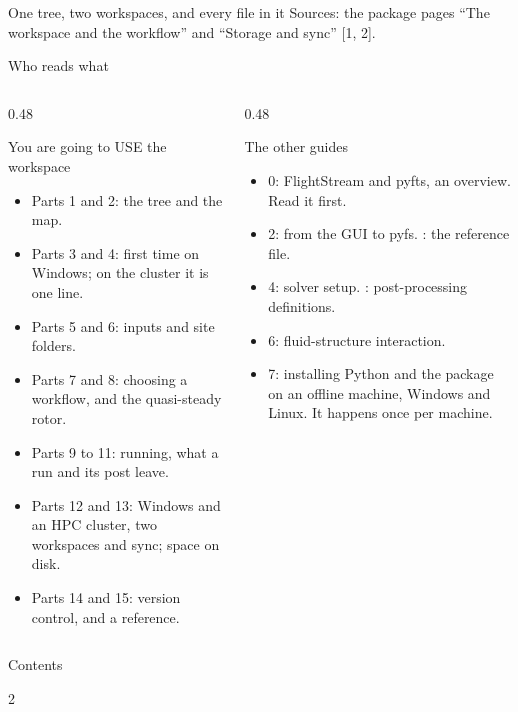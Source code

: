 \documentclass[aspectratio=169,11pt]{beamer}
\begin{document}
  {One tree, two workspaces, and every file in it}
  {Sources: the package pages ``The workspace and the workflow'' and
   ``Storage and sync'' [1, 2].}

\begin{frame}{Who reads what}
\begin{columns}[T]
\begin{column}{0.48\textwidth}
\begin{block}{You are going to USE the workspace}
\begin{itemize}\small
  \item Parts 1 and 2: the tree and the map.
  \item Parts 3 and 4: first time on Windows; on the cluster it is one line.
  \item Parts 5 and 6: inputs and site folders.
  \item Parts 7 and 8: choosing a workflow, and the quasi-steady rotor.
  \item Parts 9 to 11: running, what a run and its post leave.
  \item Parts 12 and 13: Windows and an HPC cluster, two workspaces and sync;
        space on disk.
  \item Parts 14 and 15: version control, and a reference.
\end{itemize}
\end{block}
\end{column}
\begin{column}{0.48\textwidth}
\begin{block}{The other guides}
\begin{itemize}\small
  \item 0: FlightStream and pyfts, an overview. Read it first.
  \item 2: from the GUI to pyfs. : the reference file.
  \item 4: solver setup. : post-processing definitions.
  \item 6: fluid-structure interaction.
  \item 7: installing Python and the package on an offline machine,
        Windows and Linux. It happens once per machine.
\end{itemize}
\end{block}
\end{column}
\end{columns}
\end{frame}

\begin{frame}{Contents}
\begin{multicols}{2}
\tableofcontents
\end{multicols}
\end{frame}
\end{document}
